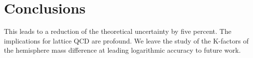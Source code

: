 \section{Conclusions}\label{sec:conclusions}

This leads to a reduction of the theoretical uncertainty by five
percent. The implications for lattice QCD are profound. We leave the
study of the K-factors of the hemisphere mass difference at leading
logarithmic accuracy to future work.

